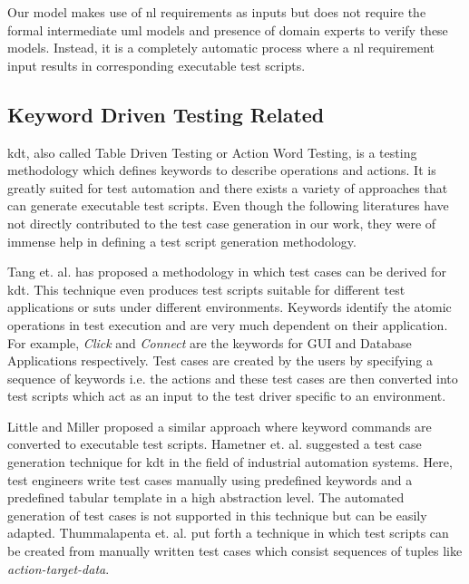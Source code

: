 Our model makes use of \gls{nl} requirements as inputs but does not require the formal intermediate \gls{uml} models and presence of domain experts to verify these models. Instead, it is a completely automatic process where a \gls{nl} requirement input results in corresponding executable test scripts.  

\subsection{Keyword Driven Testing Related}
\gls{kdt}, also called Table Driven Testing or Action Word Testing, is a testing methodology which defines keywords to describe operations and actions. It is greatly suited for test automation and there exists a variety of approaches that can generate executable test scripts. Even though the following literatures have not directly contributed to the test case generation in our work, they were of immense help in defining a test script generation methodology.

Tang et. al. \cite{tang2008towards} has proposed a methodology in which test cases can be derived for \gls{kdt}. This technique even produces test scripts suitable for different test applications or \glspl{sut} under different environments. Keywords identify the atomic operations in test execution and are very much dependent on their application. For example, \textit{Click} and \textit{Connect} are the keywords for GUI and Database Applications respectively. Test cases are created by the users by specifying a sequence of keywords i.e. the actions and these test cases are then converted into test scripts which act as an input to the test driver specific to an environment.

Little and Miller \cite{little2006translating} proposed a similar approach where keyword commands are converted to executable test scripts. Hametner et. al. \cite{hametner2012agile} suggested a test case generation technique for \gls{kdt} in the field of industrial automation systems. Here, test engineers write test cases manually using predefined keywords and a predefined tabular template in a high abstraction level. The automated generation of test cases is not supported in this technique but can be easily adapted. Thummalapenta et. al. \cite{thummalapenta2012automating} put forth a technique in which test scripts can be created from manually written test cases which consist sequences of tuples like \textit{action-target-data}.


